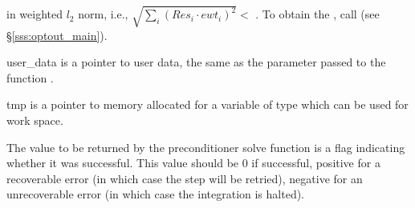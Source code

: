 {{\begin{args}
     in weighted $l_2$ norm,     
    i.e., $\sqrt{\sum_i (Res_i \cdot ewt_i)^2 } <$ .
    To obtain the  , call  
    (see \S\ref{sss:optout_main}).
  \item[user\_data]
    is a pointer to user data, the same as the       
    parameter passed to the function .
  \item[tmp]
    is a pointer to memory allocated for a variable of type    
     which can be used for work space.
  \end{args}
}
{
  The value to be returned by the preconditioner solve function is a flag
  indicating whether it was successful.  This value should be $0$ if successful, 
  positive for a recoverable error (in which case the step will be retried),     
  negative for an unrecoverable error (in which case the integration is halted). 
}
{}
}
